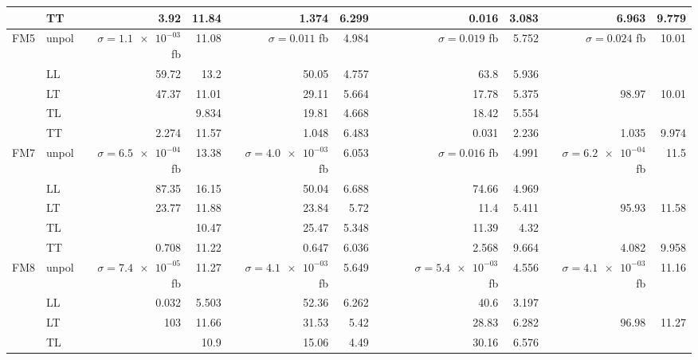 \begin{table}[h]
{\begin{tabular}{llrrrrrrrrrr}
 & TT & \num{3.92} & \num{11.84} & \num{1.374} & \num{6.299} &  &  & \num{0.016} & \num{3.083} & \num{6.963} & \num{9.779} \\
\midrule
\multirow{5}{*}{FM5}
 & unpol & $\sigma = \num{1.1e-03}$ fb & \num{11.08} & $\sigma = \num{0.011}$ fb & \num{4.984} &  &  & $\sigma = \num{0.019}$ fb & \num{5.752} & $\sigma = \num{0.024}$ fb & \num{10.01} \\
 & LL & \num{59.72} & \num{13.2} & \num{50.05} & \num{4.757} &  &  & \num{63.8} & \num{5.936} &  &  \\
 & LT & \num{47.37} & \num{11.01} & \num{29.11} & \num{5.664} &  &  & \num{17.78} & \num{5.375} & \num{98.97} & \num{10.01} \\
 & TL &  & \num{9.834} & \num{19.81} & \num{4.668} &  &  & \num{18.42} & \num{5.554} &  &  \\
 & TT & \num{2.274} & \num{11.57} & \num{1.048} & \num{6.483} &  &  & \num{0.031} & \num{2.236} & \num{1.035} & \num{9.974} \\
\midrule
\multirow{5}{*}{FM7}
 & unpol & $\sigma = \num{6.5e-04}$ fb & \num{13.38} & $\sigma = \num{4.0e-03}$ fb & \num{6.053} &  &  & $\sigma = \num{0.016}$ fb & \num{4.991} & $\sigma = \num{6.2e-04}$ fb & \num{11.5} \\
 & LL & \num{87.35} & \num{16.15} & \num{50.04} & \num{6.688} &  &  & \num{74.66} & \num{4.969} &  &  \\
 & LT & \num{23.77} & \num{11.88} & \num{23.84} & \num{5.72} &  &  & \num{11.4} & \num{5.411} & \num{95.93} & \num{11.58} \\
 & TL &  & \num{10.47} & \num{25.47} & \num{5.348} &  &  & \num{11.39} & \num{4.32} &  &  \\
 & TT & \num{0.708} & \num{11.22} & \num{0.647} & \num{6.036} &  &  & \num{2.568} & \num{9.664} & \num{4.082} & \num{9.958} \\
\midrule
\multirow{5}{*}{FM8}
 & unpol & $\sigma = \num{7.4e-05}$ fb & \num{11.27} & $\sigma = \num{4.1e-03}$ fb & \num{5.649} &  &  & $\sigma = \num{5.4e-03}$ fb & \num{4.556} & $\sigma = \num{4.1e-03}$ fb & \num{11.16} \\
 & LL & \num{0.032} & \num{5.503} & \num{52.36} & \num{6.262} &  &  & \num{40.6} & \num{3.197} &  &  \\
 & LT & \num{103} & \num{11.66} & \num{31.53} & \num{5.42} &  &  & \num{28.83} & \num{6.282} & \num{96.98} & \num{11.27} \\
 & TL &  & \num{10.9} & \num{15.06} & \num{4.49} &  &  & \num{30.16} & \num{6.576} &  &  \\

\end{tabular}}
\end{table}
